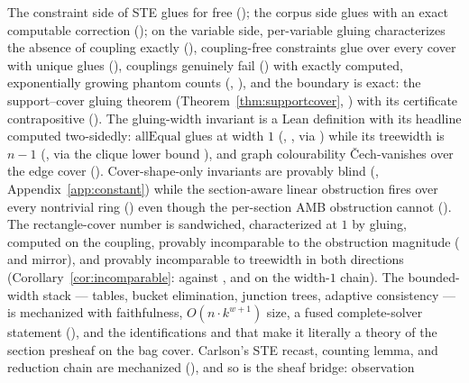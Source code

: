 \documentclass[11pt]{article}
\begin{document}
The constraint side of STE glues for free
(); the corpus side glues with
an exact computable correction (); on
the variable side, per-variable gluing characterizes the absence of
coupling exactly (),
coupling-free constraints glue over every cover with unique glues
(), couplings genuinely fail
() with exactly computed,
exponentially growing phantom counts
(,
), and the boundary is exact: the
support--cover gluing theorem (Theorem~\ref{thm:supportcover},
) with its certificate contrapositive
().  The
gluing-width invariant is a Lean definition with its headline
computed two-sidedly: $\mathrm{allEqual}$ glues at width $1$
(, , via
) while its treewidth is
$n-1$ (, via the clique
lower bound ), and graph
colourability \v{C}ech-vanishes over the edge cover
().  Cover-shape-only invariants
are provably blind (,
Appendix~\ref{app:constant}) while the section-aware linear
obstruction fires over every nontrivial ring
() even though the per-section
AMB obstruction cannot ().  The
rectangle-cover number is sandwiched, characterized at $1$ by
gluing, computed on the coupling, provably incomparable to the
obstruction magnitude
( and mirror),
and provably incomparable to treewidth in both directions
(Corollary~\ref{cor:incomparable}: 
against , and
 on the width-$1$ chain).
The bounded-width stack --- tables, bucket elimination, junction
trees, adaptive consistency --- is mechanized with faithfulness,
$O(n \cdot k^{w+1})$ size, a fused complete-solver statement
(), and the
identifications  and
 that make it literally a
theory of the section presheaf on the bag cover.  Carlson's STE
recast, counting lemma, and reduction chain are mechanized
(), and so is the sheaf bridge: observation
\end{document}
